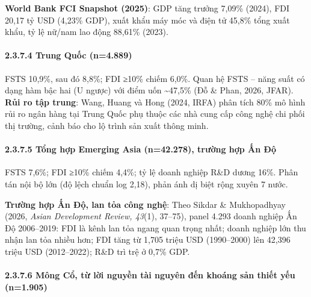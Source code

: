 \documentclass[12pt,a4paper]{article}
\begin{document}
\textbf{World Bank FCI Snapshot (2025)}: GDP tăng trưởng 7,09\% (2024),
FDI 20,17 tỷ USD (4,23\% GDP), xuất khẩu máy móc và điện tử 45,8\% tổng
xuất khẩu, tỷ lệ nữ/nam lao động 88,61\% (2023).

\hypertarget{2374-trung-quux1ed1c-n4889}{%
\paragraph{2.3.7.4 Trung Quốc
(n=4.889)}\label{2374-trung-quux1ed1c-n4889}}

FSTS 10,9\%, sau đó 8,8\%; FDI ≥10\% chiếm 6,0\%. Quan hệ FSTS -- năng
suất có dạng hàm bậc hai (U ngược) với điểm uốn \textasciitilde47,5\%
(Đỗ \& Phan, 2026, JFAR). \textbf{Rủi ro tập trung}: Wang, Huang và Hong
(2024, IRFA) phân tích 80\% mô hình rủi ro ngân hàng tại Trung Quốc phụ
thuộc các nhà cung cấp công nghệ chi phối thị trường, cảnh báo cho lộ
trình sản xuất thông minh.

\hypertarget{2375-tux1ed5ng-hux1ee3p-emerging-asia-n42278-trux1b0ux1eddng-hux1ee3p-ux1ea5n-ux111ux1ed9}{%
\paragraph{2.3.7.5 Tổng hợp Emerging Asia (n=42.278), trường hợp Ấn
Độ}\label{2375-tux1ed5ng-hux1ee3p-emerging-asia-n42278-trux1b0ux1eddng-hux1ee3p-ux1ea5n-ux111ux1ed9}}

FSTS 7,6\%; FDI ≥10\% chiếm 4,4\%; tỷ lệ doanh nghiệp R\&D dương 16\%.
Phân tán nội bộ lớn (độ lệch chuẩn log 2,18), phản ánh dị biệt rộng
xuyên 7 nước.

\textbf{Trường hợp Ấn Độ, lan tỏa công nghệ}: Theo Sikdar \&
Mukhopadhyay (2026, \emph{Asian Development Review, 43}(1), 37--75),
panel 4.293 doanh nghiệp Ấn Độ 2006--2019: FDI là kênh lan tỏa ngang
quan trọng nhất; doanh nghiệp lớn thu nhận lan tỏa nhiều hơn; FDI tăng
từ 1,705 triệu USD (1990--2000) lên 42,396 triệu USD (2012--2022); R\&D
trì trệ ở 0,7\% GDP.

\hypertarget{2376-muxf4ng-cux1ed5-tux1eeb-lux1eddi-nguyux1ec1n-tuxe0i-nguyuxean-ux111ux1ebfn-khouxe1ng-sux1ea3n-thiux1ebft-yux1ebfu-n1905}{%
\paragraph{2.3.7.6 Mông Cổ, từ lời nguyền tài nguyên đến khoáng sản
thiết yếu
(n=1.905)}\label{2376-muxf4ng-cux1ed5-tux1eeb-lux1eddi-nguyux1ec1n-tuxe0i-nguyuxean-ux111ux1ebfn-khouxe1ng-sux1ea3n-thiux1ebft-yux1ebfu-n1905}}
\end{document}
